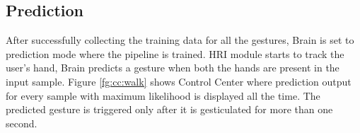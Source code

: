 \subsection{Prediction} After successfully collecting the training data for all the gestures, Brain is set to prediction mode where the pipeline is trained. HRI module starts to track the user's hand, Brain predicts a gesture when both the hands are present in the input sample. Figure \ref{fg:cc:walk} shows Control Center where prediction output for every sample with maximum likelihood is displayed all the time. The predicted gesture is triggered only after it is gesticulated for more than one second.

 
